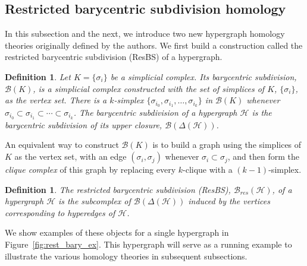 \documentclass{amsart}
\newtheorem{definition}[theorem]{Definition}
\renewcommand{\H}{\mathcal{H}}
\newcommand{\bary}{\mathcal{B}}
\begin{document}
\subsection{Restricted barycentric subdivision homology}
\label{sec:ResBS}

In this subsection and the next, we introduce two new hypergraph homology theories originally defined by the authors. We first build a construction called the restricted barycentric subdivision (ResBS) of a hypergraph. 

\begin{definition}
\label{def:rbs}
Let $K=\{\sigma_i\}$ be a simplicial complex. 
Its \emph{barycentric subdivision}, $\bary(K)$, is a simplicial complex constructed with the set of simplices of $K$, $\{\sigma_i\}$, as the vertex set. 
There is a $k$-simplex $\{\sigma_{i_0}, \sigma_{i_1}, \ldots, \sigma_{i_k}\}$ in $\bary(K)$ whenever $\sigma_{i_0}\subset\sigma_{i_1}\subset \cdots \subset \sigma_{i_k}$.
The \emph{barycentric subdivision of a hypergraph} $\H$ is the barycentric subdivision of its upper closure, $\bary(\Delta(\H))$.
\end{definition}

An equivalent way to construct $\bary(K)$ is to build a graph using the simplices of $K$ as the vertex set, with an edge $(\sigma_i, \sigma_j)$ whenever $\sigma_i \subset \sigma_j$, and then form the \emph{clique complex} of this graph by replacing every $k$-clique with a $(k-1)$-simplex.

\begin{definition}
The \emph{restricted barycentric subdivision (ResBS)}, $\bary_{res}(\H)$, of a hypergraph $\H$ is the subcomplex of $\bary(\Delta(\H))$ induced by the vertices corresponding to hyperedges of $\H$. 
\end{definition}
\noindent We show examples of these objects for a single hypergraph in Figure~\ref{fig:rest_bary_ex}.
This hypergraph will serve as a running example to illustrate the various homology theories in subsequent subsections.
\end{document}
